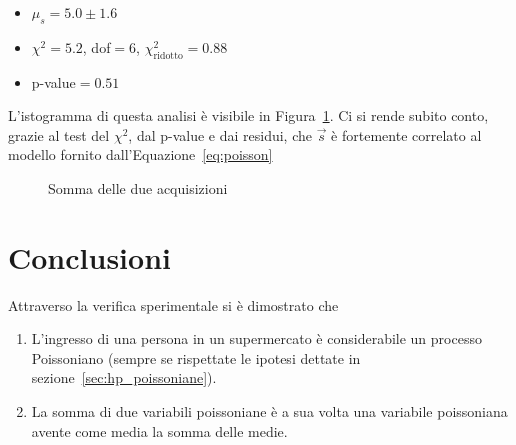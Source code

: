 \documentclass[a4paper,12pt]{article}
\begin{document}
\begin{itemize}
    \item $\mu_s = 5.0 \pm 1.6$
    \item $\chi^2 = 5.2$, dof$=6$, $\chi^2_\text{ridotto} = 0.88$
    \item p-value$=0.51$ 
\end{itemize}

L'istogramma di questa analisi è visibile in Figura~\ref{fig:set3}. Ci si rende subito conto, grazie al test del $\chi^2$, dal p-value e dai residui, che $\vec{s}$ è fortemente correlato al modello fornito dall'Equazione~\ref{eq:poisson}

\begin{figure}
    \centering
    \sffamily
    \resizebox{0.85\textwidth}{!}{%
        
    }
    \caption{Somma delle due acquisizioni}%
    \label{fig:set3}
\end{figure}

\section{Conclusioni}

Attraverso la verifica sperimentale si è dimostrato che 

\begin{enumerate}
    \item L'ingresso di una persona in un supermercato è considerabile un processo Poissoniano (sempre se rispettate le ipotesi dettate in sezione~\ref{sec:hp_poissoniane}).
    \item La somma di due variabili poissoniane è a sua volta una variabile poissoniana avente come media la somma delle medie.
\end{enumerate}
\end{document}
